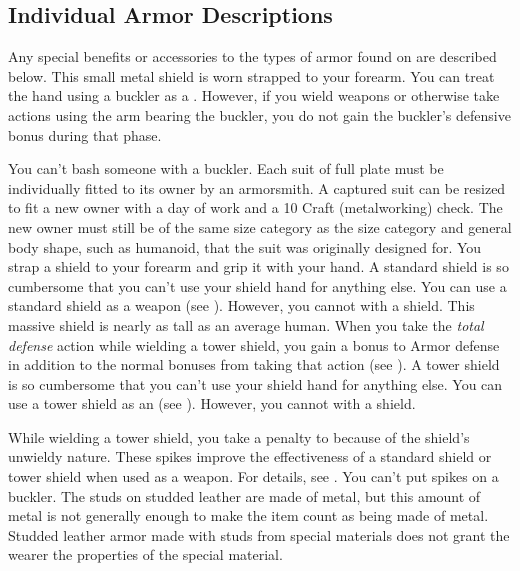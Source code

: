    \subsection{Individual Armor Descriptions}
        Any special benefits or accessories to the types of armor found on  are described below.
         This small metal shield is worn strapped to your forearm.
        You can treat the hand using a buckler as a .
        However, if you wield weapons or otherwise take actions using the arm bearing the buckler, you do not gain the buckler's defensive bonus during that phase.
        \par You can't bash someone with a buckler.
         Each suit of full plate must be individually fitted to its owner by an armorsmith.
        A captured suit can be resized to fit a new owner with a day of work and a  10 Craft (metalworking) check.
        The new owner must still be of the same size category as the size category and general body shape, such as humanoid, that the suit was originally designed for.
         You strap a shield to your forearm and grip it with your hand.
        A standard shield is so cumbersome that you can't use your shield hand for anything else.
        You can use a standard shield as a weapon (see ).
        However, you cannot  with a shield.
         This massive shield is nearly as tall as an average human.
        When you take the \textit{total defense} action while wielding a tower shield, you gain a  bonus to Armor defense in addition to the normal bonuses from taking that action (see ).
        A tower shield is so cumbersome that you can't use your shield hand for anything else.
        You can use a tower shield as an  (see ).
        However, you cannot  with a shield.

        While wielding a tower shield, you take a  penalty to  because of the shield's unwieldy nature.
         These spikes improve the effectiveness of a standard shield or tower shield when used as a weapon.
        For details, see .
        You can't put spikes on a buckler.
         The studs on studded leather are made of metal, but this amount of metal is not generally enough to make the item count as being made of metal.
        Studded leather armor made with studs from special materials does not grant the wearer the properties of the special material.


